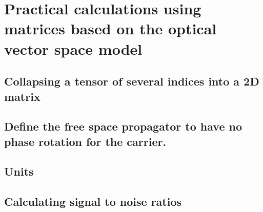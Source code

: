 \chapter{Practical calculations using matrices based on the optical vector space model}

\section{Collapsing a tensor of several indices into a 2D matrix}

\section{Define the free space propagator to have no phase rotation for the  carrier.}

\section{Units}

\section{Calculating signal to noise ratios}

